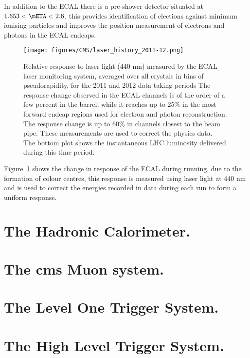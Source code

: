 In addition to the ECAL there is a pre-shower detector situated at $1.653 < 
\mETA < 2.6$, this provides identification of elections against minimum 
ionising particles and improves the position measurement of electrons and 
photons in the ECAL endcaps.
\begin{figure}[ht]
  \centering
    \texttt{[image: figures/CMS/laser\_history\_2011-12.png]}
  \caption{Relative response to laser light (440 nm) measured by the ECAL laser monitoring system, averaged over all crystals in bins of pseudorapidity, for the 2011 and 2012 data taking periods 
The response change observed in the ECAL channels is of the order of a few percent in the barrel, while it reaches up to 25$\%$ in the most forward endcap regions used for electron and photon reconstruction. The response change is up to 60$\%$ in channels closest to the beam pipe. These measurements are used to correct the physics data. \\ The bottom plot shows the instantaneous LHC luminosity delivered during this time period.\cite{CMS-DP-2012-015}}
  \label{fig:figures_CMS_laser_history_2011-12}
\end{figure}

Figure~\ref{fig:figures_CMS_laser_history_2011-12} shows the change in response 
of the ECAL during running, due to the formation of colour centres, this 
response is measured using laser light at 440 nm and is used to correct the 
energies recorded in data during each run to form a uniform response.


\section{The Hadronic Calorimeter.} %
\label{sec:the_hadronic_calorimeter}


\section{The \ac{cms} Muon system.} %
\label{sec:the_cms_muon_system}


\section{The Level One Trigger System.} %
\label{sec:the_level_one_trigger_system}


\section{The High Level Trigger System.} %
\label{sec:the_high_level_trigger_system}


